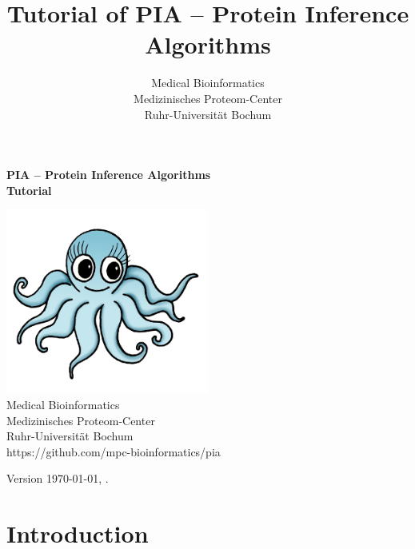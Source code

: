 \documentclass[a4paper,11pt,twoside]{article}
\title{Tutorial of PIA -- Protein Inference Algorithms}
\author{Medical Bioinformatics\\
	Medizinisches Proteom-Center\\
	Ruhr-Universität Bochum}
\begin{document}
\thispagestyle{empty}
\begin{titlepage}
	\vspace*{\fill}
	\begin{adjustwidth}{-2cm}{-2cm}
		\begin{center}
			{\huge \textbf{PIA -- Protein Inference Algorithms\\
					Tutorial}\\[2cm]}
		\end{center}
	\end{adjustwidth}

	\begin{center}
		\includegraphics[width=0.5\textwidth]{graphics/pia_logo_big}\\[2cm]

		{\large Medical Bioinformatics\\
			Medizinisches Proteom-Center\\
			Ruhr-Universität Bochum\\[0.5cm]}
		{\large https://github.com/mpc-bioinformatics/pia\\[0.1cm]}
	\end{center}

	\vspace*{2cm}
	\begin{center}
		Version \today{}, \currenttime{}.
	\end{center}
	\vspace*{\fill}
\end{titlepage}


\tableofcontents
\newpage


\section{Introduction}
\end{document}
